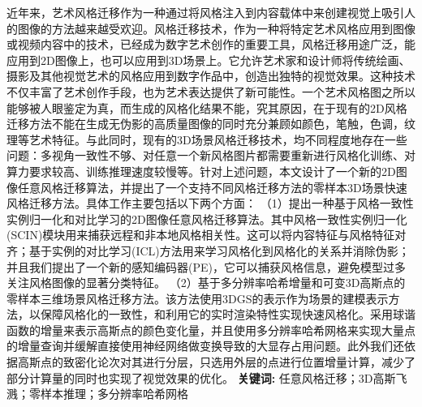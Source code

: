 \cleardoublepage
{}

\setlength{\parindent}{2em} 
近年来，艺术风格迁移作为一种通过将风格注入到内容载体中来创建视觉上吸引人的图像的方法越来越受欢迎。风格迁移技术，作为一种将特定艺术风格应用到图像或视频内容中的技术，已经成为数字艺术创作的重要工具，风格迁移用途广泛，能应用到2D图像上，也可以应用到3D场景上。它允许艺术家和设计师将传统绘画、摄影及其他视觉艺术的风格应用到数字作品中，创造出独特的视觉效果。这种技术不仅丰富了艺术创作手段，也为艺术表达提供了新可能性。一个艺术风格图之所以能够被人眼鉴定为真，而生成的风格化结果不能，究其原因，在于现有的2D风格迁移方法不能在生成无伪影的高质量图像的同时充分兼顾如颜色，笔触，色调，纹理等艺术特征。与此同时，现有的3D场景风格迁移技术，均不同程度地存在一些问题：多视角一致性不够、对任意一个新风格图片都需要重新进行风格化训练、对算力要求较高、训练推理速度较慢等。针对上述问题，本文设计了一个新的2D图像任意风格迁移算法，并提出了一个支持不同风格迁移方法的零样本3D场景快速风格迁移方法。具体工作主要包括以下两个方面：
\newline \indent（1）提出一种基于风格一致性实例归一化和对比学习的2D图像任意风格迁移算法。其中风格一致性实例归一化 (SCIN)模块用来捕获远程和非本地风格相关性。这可以将内容特征与风格特征对齐；基于实例的对比学习(ICL)方法用来学习风格化到风格化的关系并消除伪影；并且我们提出了一个新的感知编码器(PE)，它可以捕获风格信息，避免模型过多关注风格图像的显著分类特征。   
\newline \indent（2）基于多分辨率哈希增量和可变3D高斯点的零样本三维场景风格迁移方法。该方法使用3DGS的表示作为场景的建模表示方法，以保障风格化的一致性，和利用它的实时渲染特性实现快速风格化。采用球谐函数的增量来表示高斯点的颜色变化量，并且使用多分辨率哈希网格来实现大量点的增量查询并缓解直接使用神经网络做变换导致的大显存占用问题。此外我们还依据高斯点的致密化论次对其进行分层，只选用外层的点进行位置增量计算，减少了部分计算量的同时也实现了视觉效果的优化。
\newline
{\textbf{关键词:}}
任意风格迁移；3D高斯飞溅；零样本推理；多分辨率哈希网格

